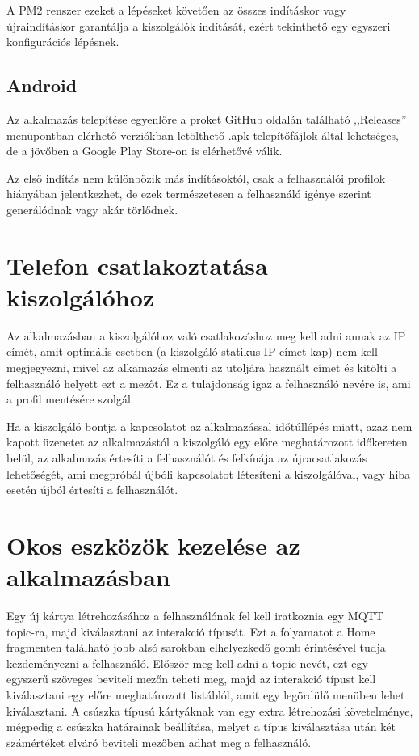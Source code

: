 \documentclass[
]{thesis-ekf}
\theoremstyle{definition}
\theoremstyle{remark}
\begin{document}
A PM2 renszer ezeket a lépéseket követően az összes indításkor vagy újraindításkor garantálja a kiszolgálók
indítását, ezért tekinthető egy egyszeri konfigurációs lépésnek.


\subsection{Android}
Az alkalmazás telepítése egyenlőre a proket GitHub oldalán\cite{github}
található ,,Releases'' menüpontban elérhető verziókban letölthető .apk telepítőfájlok által lehetséges, de a jövőben
a Google Play Store-on is elérhetővé válik.

Az első indítás nem különbözik más indításoktól, csak a felhasználói profilok hiányában jelentkezhet, de ezek
természetesen a felhasználó igénye szerint generálódnak vagy akár törlődnek.

\section{Telefon csatlakoztatása kiszolgálóhoz}
Az alkalmazásban a kiszolgálóhoz való csatlakozáshoz meg kell adni annak az IP címét, amit optimális esetben
(a kiszolgáló statikus IP címet kap) nem kell megjegyezni, mivel az alkamazás elmenti az utoljára használt címet
és kitölti a felhasználó helyett ezt a mezőt. Ez a tulajdonság igaz a felhasználó nevére is, ami a profil mentésére
szolgál.

Ha a kiszolgáló bontja a kapcsolatot az alkalmazással időtúllépés miatt, azaz nem kapott üzenetet az alkalmazástól
a kiszolgáló egy előre meghatározott időkereten belül, az alkalmazás értesíti a felhasználót és felkínája
az újracsatlakozás lehetőségét, ami megpróbál újbóli kapcsolatot létesíteni a kiszolgálóval, vagy hiba esetén
újból értesíti a felhasználót.

\section{Okos eszközök kezelése az alkalmazásban}
Egy új kártya létrehozásához a felhasználónak fel kell iratkoznia egy MQTT topic-ra, majd kiválasztani az interakció
típusát. Ezt a folyamatot a Home fragmenten található jobb alsó sarokban elhelyezkedő gomb érintésével
tudja kezdeményezni a felhasználó. Először meg kell adni a topic nevét, ezt egy egyszerű szöveges beviteli mezőn
teheti meg, majd az interakció típust kell kiválasztani egy előre meghatározott listáblól, amit egy legördülő
menüben lehet kiválasztani. A csúszka típusú kártyáknak van egy extra létrehozási követelménye, mégpedig a
csúszka határainak beállítása, melyet a típus kiválasztása után két számértéket elváró beviteli mezőben adhat
meg a felhasználó.
\end{document}
